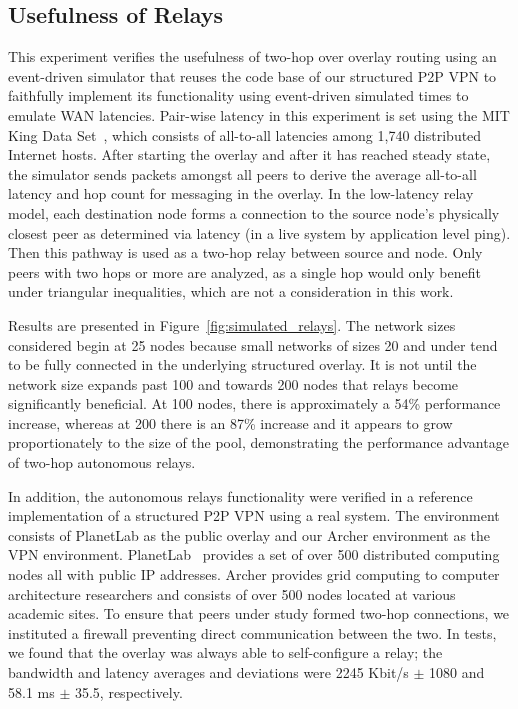\subsection{Usefulness of Relays}
This experiment verifies the usefulness of two-hop over overlay routing using
an event-driven simulator that reuses the code base of our structured P2P VPN to
faithfully implement its functionality using event-driven simulated times to
emulate WAN latencies.  Pair-wise latency in this experiment is set using
the MIT King Data Set~\cite{king_data}, which consists of all-to-all latencies
among 1,740 distributed Internet hosts.  After starting the overlay and after
it has reached steady state, the simulator sends packets amongst all peers to
derive the average all-to-all latency and hop count for messaging in the
overlay.  In the low-latency relay model, each destination node forms a
connection to the source node's physically closest peer as determined via
latency (in a live system by application level ping).  Then this pathway is
used as a two-hop relay between source and node.  Only peers with two hops or
more are analyzed, as a single hop would only benefit under triangular
inequalities, which are not a consideration in this work.

Results are presented in Figure~\ref{fig:simulated_relays}. The network sizes
considered begin at 25 nodes because small networks of sizes 20 and under tend
to be fully connected in the underlying structured overlay.  It is not until
the network size expands past 100 and towards 200 nodes that relays become
significantly beneficial.  At 100 nodes, there is approximately a 54\%
performance increase, whereas at 200 there is an 87\% increase and it appears
to grow proportionately to the size of the pool, demonstrating the performance
advantage of two-hop autonomous relays.

In addition, the autonomous relays functionality were verified in a reference
implementation of a structured P2P VPN using a real system.  The environment
consists of PlanetLab as the public overlay and our Archer environment as the
VPN environment.  PlanetLab~\cite{planetlab} provides a set of over 500
distributed computing nodes all with public IP addresses.  Archer provides grid
computing to computer architecture researchers and consists of over 500 nodes
located at various academic sites.  To ensure that peers under study formed
two-hop connections, we instituted a firewall preventing direct communication
between the two.  In tests, we found that the overlay was always able to
self-configure a relay; the bandwidth and latency averages and deviations were
2245 Kbit/s $\pm$ 1080 and 58.1 ms $\pm$ 35.5, respectively.

